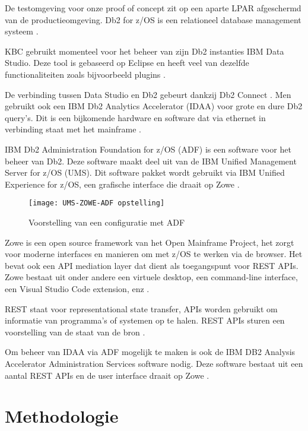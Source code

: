 De testomgeving voor onze proof of concept zit op een aparte LPAR afgeschermd van de productieomgeving.
Db2 for z/OS is een relationeel database management systeem \autocite{IBM2022a}.

KBC gebruikt momenteel voor het beheer van zijn Db2 instanties IBM Data Studio. Deze tool is gebaseerd op Eclipse en heeft veel van dezelfde functionaliteiten zoals bijvoorbeeld plugins \autocite{IBM2021}.

De verbinding tussen Data Studio en Db2 gebeurt dankzij Db2 Connect \autocite{IBM2022b}. Men gebruikt ook een IBM Db2 Analytics Accelerator (IDAA) voor grote en dure Db2 query’s. Dit is een bijkomende hardware en software dat via ethernet in verbinding staat met het mainframe \autocite{Bruni2012}. 

IBM Db2 Administration Foundation for z/OS (ADF) is een software voor het beheer van Db2. Deze software maakt deel uit van de IBM Unified Management Server for z/OS (UMS). Dit software pakket wordt gebruikt via IBM Unified Experience for z/OS, een grafische interface die draait op Zowe \autocite{IBM2022c}.

\begin{figure}[h]
    \texttt{[image: UMS-ZOWE-ADF opstelling]}
    \caption{Voorstelling van een configuratie met ADF \autocite{IBM2022c}}
\end{figure}

Zowe is een open source framework van het Open Mainframe Project, het zorgt voor moderne interfaces en manieren om met z/OS te werken via de browser. Het bevat ook een API mediation layer dat dient als toegangspunt voor REST APIs. Zowe bestaat uit onder andere een virtuele desktop, een command-line interface, een Visual Studio Code extension, enz \autocite{Zowe2022}.

REST staat voor representational state transfer, APIs worden gebruikt om informatie van programma’s of systemen op te halen. REST APIs sturen een voorstelling van de staat van de bron \autocite{RedHat2020}.

Om beheer van IDAA via ADF mogelijk te maken is ook de IBM DB2 Analysis Accelerator Administration Services software nodig. Deze software bestaat uit een aantal REST APIs en de user interface draait op Zowe \autocite{IBM2022d}.


\section{Methodologie}%
\label{sec:methodologie}

